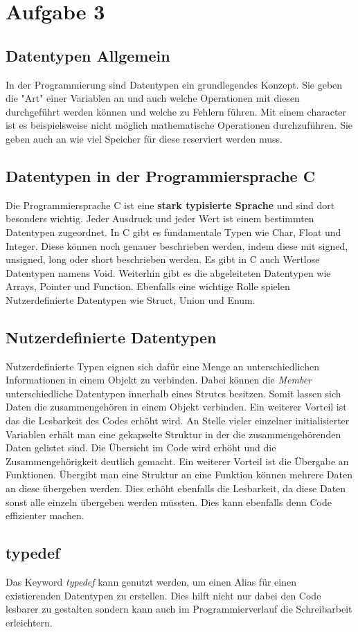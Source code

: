 \chapter{Aufgabe 3}
\section{Datentypen Allgemein}
In der Programmierung sind Datentypen ein grundlegendes Konzept. Sie geben die "Art" einer Variablen an und auch welche Operationen mit diesen durchgeführt werden können und welche zu Fehlern führen. Mit einem character ist es beispielsweise nicht möglich mathematische Operationen durchzuführen. Sie geben auch an wie viel Speicher für diese reserviert werden muss. 

\section{Datentypen in der Programmiersprache C}
Die Programmiersprache C ist eine \textbf{stark typisierte Sprache} und sind dort besonders wichtig. Jeder Ausdruck und jeder Wert ist einem bestimmten Datentypen zugeordnet.
In C gibt es fundamentale Typen wie Char, Float und Integer. Diese können noch genauer beschrieben werden, indem diese mit signed, unsigned, long oder short beschrieben werden. Es gibt in C auch Wertlose Datentypen namens Void. Weiterhin gibt es die abgeleiteten Datentypen wie Arrays, Pointer und Function. Ebenfalls eine wichtige Rolle spielen Nutzerdefinierte Datentypen wie Struct, Union und Enum.

\section{Nutzerdefinierte Datentypen}
Nutzerdefinierte Typen eignen sich dafür eine Menge an unterschiedlichen Informationen in einem Objekt zu verbinden. Dabei können die \textit{Member} unterschiedliche Datentypen innerhalb eines Strutcs besitzen. Somit lassen sich Daten die zusammengehören in einem Objekt verbinden. Ein weiterer Vorteil ist das die Lesbarkeit des Codes erhöht wird. An Stelle vieler einzelner initialisierter Variablen erhält man eine gekapselte Struktur in der die zusammengehörenden Daten gelistet sind. Die Übersicht im Code wird erhöht und die Zusammengehörigkeit deutlich gemacht. Ein weiterer Vorteil ist die Übergabe an Funktionen. Übergibt man eine Struktur an eine Funktion können mehrere Daten an diese übergeben werden. Dies erhöht ebenfalls die Lesbarkeit, da diese Daten sonst alle einzeln übergeben werden müssten. Dies kann ebenfalls denn Code effizienter machen.

\section{typedef}
Das Keyword \textit{typedef} kann genutzt werden, um einen Alias für einen existierenden Datentypen zu erstellen. Dies hilft nicht nur dabei den Code lesbarer zu gestalten sondern kann auch im Programmierverlauf die Schreibarbeit erleichtern.

